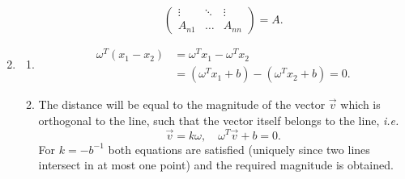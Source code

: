 \documentclass[11pt]{article}
\begin{document}
\begin{enumerate}
\begin{enumerate}
\begin{equation*}
\begin{pmatrix}
          \vdots &\ddots &\vdots\\
          A_{n1} &\dots &A_{nn}          
        \end{pmatrix} = A.
      \end{equation*}
  \end{enumerate}
\item
  \begin{enumerate}
  \item
    \begin{align*}
      \omega^T(x_1 - x_2) &= \omega^Tx_1 - \omega^Tx_2\\
      &= (\omega^Tx_1 + b) - (\omega^Tx_2 + b) = 0.
    \end{align*}
  \item
    The distance will be equal to the magnitude of the vector $\vec{v}$ which is
    orthogonal to the
    line, such that the vector itself belongs to the line, \textit{i.e.}
    \begin{equation*}
      \vec{v} = k\omega, \quad \omega^T\vec{v} + b = 0.
    \end{equation*}
    For $k = -b^{-1}$ both equations are satisfied (uniquely since two lines
    intersect in at most one point) and the required magnitude is obtained.
  \end{enumerate}
\end{enumerate}
\newpage
\end{document}
